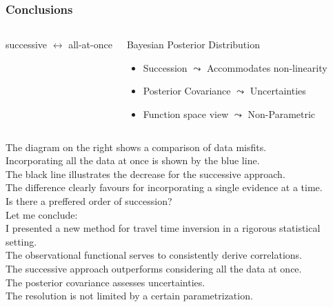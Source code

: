 \documentclass[aspectratio=169, t, 10pt,
    ]{beamer}
\begin{document}
\begin{frame}
    \frametitle{Conclusions}

\begin{columns}
%

    \begin{center}
        successive $\leftrightarrow$ all-at-once

        ~%
    \end{center}

    \begin{exampleblock}{Bayesian Posterior Distribution}
    \begin{itemize}
        \item Succession \hfill $\leadsto$ \hfill Accommodates non-linearity
        \item Posterior Covariance \hfill $\leadsto$ \hfill Uncertainties
        \item Function space view \hfill $\leadsto$ \hfill Non-Parametric
    \end{itemize}
    \end{exampleblock}


    \vspace{-6mm}
    \centering
    \only{}
\end{columns}

\end{frame}

The diagram on the right shows a comparison of data misfits.
\\
Incorporating all the data at once is shown by the blue line.
\\
The black line illustrates the decrease for the successive approach.
\\
The difference clearly favours for incorporating a single evidence at a time.
\\
Is there a preffered order of succession?
\\[2mm]

Let me conclude:
\\
I presented a new method for travel time inversion in a rigorous statistical setting.
\\
The observational functional serves to consistently derive correlations.
\\
The successive approach outperforms considering all the data at once.
\\
The posterior covariance assesses uncertainties.
\\
The resolution is not limited by a certain parametrization.
\end{document}
